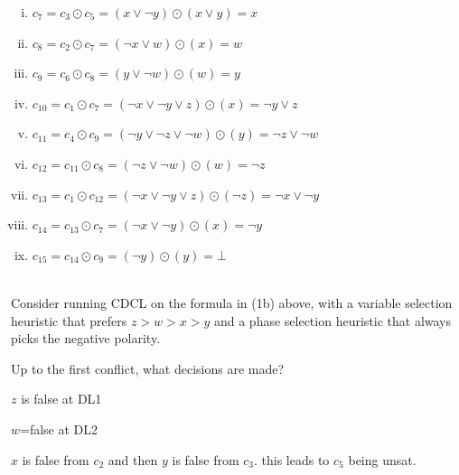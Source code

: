 \documentclass[11pt]{article}
\begin{document}
\begin{qunlist}
\begin{qparts}
    \begin{answer}
      \begin{enumerate}[i.]
        \item $c_7 = c_3 \odot c_5 = (x \lor \lnot y) \odot (x \lor y) = x$

        \item $c_8 = c_2 \odot c_7 = (\lnot x \lor w) \odot (x) = w$

        \item $c_9 = c_6 \odot c_8 = (y \lor \lnot w) \odot (w) = y$

        \item $c_{10} = c_1 \odot c_7 = (\lnot x \lor \lnot y \lor z) \odot (x) = \lnot y \lor z$

        \item $c_{11} = c_4 \odot c_9 = (\lnot y \lor \lnot z \lor \lnot w) \odot (y) = \lnot z \lor \lnot w$

        \item $c_{12} = c_{11} \odot c_8 = (\lnot z \lor \lnot w) \odot (w) = \lnot z$

        \item $c_{13} = c_1 \odot c_{12} = (\lnot x \lor \lnot y \lor z) \odot (\lnot z) = \lnot x \lor \lnot y$

        \item $c_{14} = c_{13} \odot c_7 = (\lnot x \lor \lnot y) \odot (x) = \lnot y$

        \item $c_{15} = c_{14} \odot c_9 = (\lnot y) \odot (y) = \bot$
      \end{enumerate}

    \end{answer}
  \end{qparts}


  \\
  Consider running CDCL on the formula in (1b) above, with a variable selection heuristic that prefers $z > w > x > y$ and a phase selection heuristic that always picks the negative polarity.
  \begin{qparts}
  \item
    Up to the first conflict, what decisions are made?

    \begin{answer}
      \(z\) is false at DL1

      \(w\)=false at DL2

      \(x\) is false from \(c_2\) and then \(y\) is false from \(c_3\). this leads to \(c_5\) being unsat.
    \end{answer}


\end{qparts}
\end{qunlist}
\end{document}
